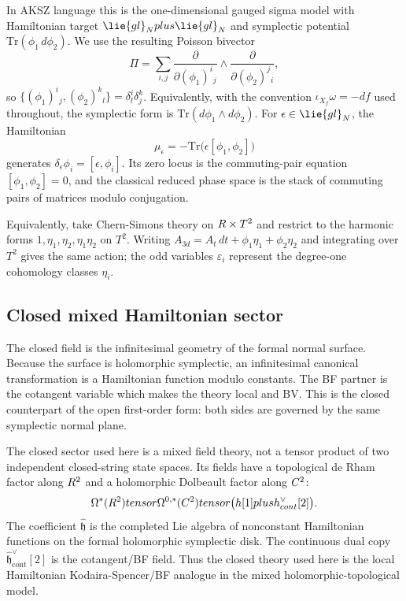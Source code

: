 \documentclass[11pt]{memoir}
\begin{document}
\begin{rmk}
  In AKSZ language this is the one-dimensional gauged sigma model with
  Hamiltonian target $\lie{gl}_N\oplus\lie{gl}_N$ and symplectic potential
  $\mathrm{Tr}(\phi_1\,d\phi_2)$. We use the resulting Poisson bivector
  $$\Pi=\sum_{i,j}\frac{\partial}{\partial(\phi_1)^i{}_j}
    \wedge\frac{\partial}{\partial(\phi_2)^j{}_i},$$
  so $\{(\phi_1)^i{}_j,(\phi_2)^k{}_l\}=\delta^i_l\delta^k_j$. Equivalently,
  with the convention $\iota_{X_f}\omega=-df$ used throughout, the symplectic
  form is $\mathrm{Tr}(d\phi_1\wedge d\phi_2)$. For
  $\epsilon\in\lie{gl}_N$, the Hamiltonian
  $$\mu_\epsilon=-\mathrm{Tr}\bigl(\epsilon[\phi_1,\phi_2]\bigr)$$
  generates $\delta_\epsilon\phi_i=[\epsilon,\phi_i]$. Its zero locus is the
  commuting-pair equation $[\phi_1,\phi_2]=0$, and the classical reduced phase
  space is the stack of commuting pairs of matrices modulo conjugation.
\end{rmk}

\begin{rmk}
  Equivalently, take Chern-Simons theory on $R\times T^2$ and restrict to the
  harmonic forms $1,\eta_1,\eta_2,\eta_1\eta_2$ on $T^2$. Writing
  $A_{3d}=A_t\,dt+\phi_1\eta_1+\phi_2\eta_2$ and integrating over $T^2$
  gives the same action; the odd variables $\varepsilon_i$ represent the
  degree-one cohomology classes $\eta_i$.
\end{rmk}

\subsection{Closed mixed Hamiltonian sector}

The closed field is the infinitesimal geometry of the formal normal surface.
Because the surface is holomorphic symplectic, an infinitesimal canonical
transformation is a Hamiltonian function modulo constants. The BF partner is
the cotangent variable which makes the theory local and BV. This is the closed
counterpart of the open first-order form: both sides are governed by the same
symplectic normal plane.

The closed sector used here is a mixed field theory, not a tensor product of
two independent closed-string state spaces. Its fields have a topological de
Rham factor along $R^2$ and a holomorphic Dolbeault factor along $C^2$:
$$\Omega^*(R^2)tensor\Omega^{0,*}(C^2)
  tensor\bigl(h[1]plus
  h^{\vee}_{cont}[2]\bigr).$$
The coefficient $\widehat{\mathfrak h}$ is the completed Lie algebra of
nonconstant Hamiltonian functions on the formal holomorphic symplectic disk.
The continuous dual copy
$\widehat{\mathfrak h}^{\vee}_{\mathrm{cont}}[2]$ is the cotangent/BF field.
Thus the closed theory used here is the local Hamiltonian
Kodaira-Spencer/BF analogue in the mixed holomorphic-topological model.
\end{document}
